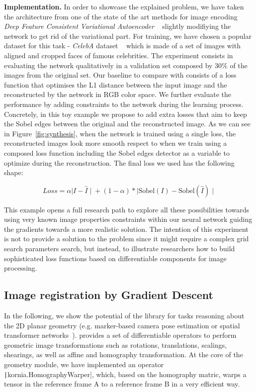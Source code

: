 \textbf{Implementation.} In order to showcase the explained problem, we have taken the architecture from one of the state of the art methods for image encoding \textit{Deep Feature Consistent Variational Autoencoder} ~\citep{DBLP:journals/corr/HouSSQ16a} slightly modifiying the network to get rid of the variational part. For training, we have chosen a popular dataset for this task - \textit{CelebA} dataset ~\citep{liu2015faceattributes} which is made of a set of images with aligned and cropped faces of famous celebrities. The experiment consists in evaluating the network qualitatively in a validation set composed by 30\% of the images from the original set. Our baseline to compare with consists of a loss function that optimises the L1 distance between the input image and the reconstructed by the network in RGB color space. We further evaluate the performance by adding constraints to the network during the learning process. Concretely, in this toy example we propose to add extra losses that aim  to keep the Sobel edges between the original and the reconstructed image. As we can see in Figure~\ref{fig:synthesis}, when the network is trained using a single loss, the reconstructed images look more smooth respect to when we train using a composed loss function including the Sobel edges detector as a variable to optimize during the reconstruction. The final loss we used has the following shape:

\begin{equation}
    \label{eq:synthesis_loss1}
	Loss = \alpha {\mid I - \hat{I} \mid} + (1 - \alpha) * {\mid \text{Sobel}(I) - \text{Sobel}(\hat{I}) \mid}
\end{equation}

This example opens a full research path to explore all these possibilities towards using very known image properties constraints within our neural network guiding the gradients towards a more realistic solution. The intention of this experiment is not to provide a solution to the problem since it might require a complex grid search parameters search, but instead,  to illustrate researchers how to build sophisticated loss functions based on \lib{} differentiable components for image processing.

\subsection{Image registration by Gradient Descent}
\label{section:use_cases:homography_estimation}
%
In the following, we show the potential of the library for tasks reasoning about the 2D planar geometry (e.g. marker-based camera pose estimation or spatial transformer networks~\citep{jaderberg2015spatial}). \lib{} provides a set of differentiable operators to perform geometric image transformations such as rotations, translations, scalings, shearings, as well as affine and homography transformation. At the core of the geometry module, we have implemented an operator \texttt|kornia.HomographyWarper|, which, based on the homography matric, warps a tensor in the reference frame A to a reference frame B  in a very efficient way.

